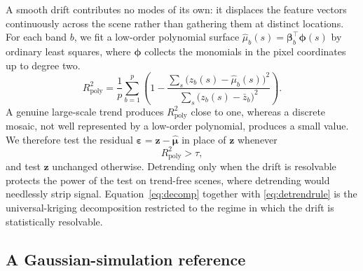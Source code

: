 A smooth drift contributes no modes of its own: it displaces the
feature vectors continuously across the scene rather than gathering them at
distinct locations.  For each band $b$, we fit a
low-order polynomial surface $\hat\mu_b(s)=\bm\beta_b^{\!\top}\bm\phi(s)$ by
ordinary least squares, where $\bm\phi$ collects the monomials in the pixel
coordinates up to degree two. 
\begin{equation}\label{eq:r2}
  R^2_{\mathrm{poly}}
  =\frac1p\sum_{b=1}^{p}
   \left(1-\frac{\sum_{s}\bigl(z_b(s)-\hat\mu_b(s)\bigr)^2}
               {\sum_{s}\bigl(z_b(s)-\bar z_b\bigr)^2}\right).
\end{equation}
A genuine large-scale trend
produces $R^2_{\mathrm{poly}}$ close to one, whereas a discrete mosaic, not
well represented by a low-order polynomial, produces a small value. We
therefore test the residual $\bm\varepsilon=\bm z-\hat{\bm\mu}$ in place of
$\bm z$ whenever
\begin{equation}\label{eq:detrendrule}
  R^2_{\mathrm{poly}}>\tau,
\end{equation}
and test $\bm z$ unchanged otherwise.  Detrending only when the drift is
resolvable protects the power of the test on trend-free scenes, where
detrending would needlessly strip signal. Equation~\eqref{eq:decomp} together with
\eqref{eq:detrendrule} is the universal-kriging decomposition restricted to
the regime in which the drift is statistically resolvable.

\subsection{A Gaussian-simulation reference}\label{subsec:sgs}


